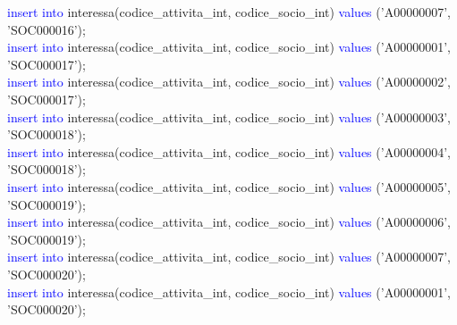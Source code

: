 \documentclass{article}
\begin{document}
\begin{flushleft}
{        \hspace*{0.5em}\textcolor{blue}{insert into} interessa(codice\_attivita\_int, codice\_socio\_int) \textcolor{blue}{values} \hspace*{0.5em}('A00000007', 'SOC000016'); \\
        \hspace*{0.5em}\textcolor{blue}{insert into} interessa(codice\_attivita\_int, codice\_socio\_int) \textcolor{blue}{values} \hspace*{0.5em}('A00000001', 'SOC000017'); \\
        \hspace*{0.5em}\textcolor{blue}{insert into} interessa(codice\_attivita\_int, codice\_socio\_int) \textcolor{blue}{values} \hspace*{0.5em}('A00000002', 'SOC000017'); \\
        \hspace*{0.5em}\textcolor{blue}{insert into} interessa(codice\_attivita\_int, codice\_socio\_int) \textcolor{blue}{values} \hspace*{0.5em}('A00000003', 'SOC000018'); \\
        \hspace*{0.5em}\textcolor{blue}{insert into} interessa(codice\_attivita\_int, codice\_socio\_int) \textcolor{blue}{values} \hspace*{0.5em}('A00000004', 'SOC000018'); \\
        \hspace*{0.5em}\textcolor{blue}{insert into} interessa(codice\_attivita\_int, codice\_socio\_int) \textcolor{blue}{values} \hspace*{0.5em}('A00000005', 'SOC000019'); \\
        \hspace*{0.5em}\textcolor{blue}{insert into} interessa(codice\_attivita\_int, codice\_socio\_int) \textcolor{blue}{values} \hspace*{0.5em}('A00000006', 'SOC000019'); \\
        \hspace*{0.5em}\textcolor{blue}{insert into} interessa(codice\_attivita\_int, codice\_socio\_int) \textcolor{blue}{values} \hspace*{0.5em}('A00000007', 'SOC000020'); \\
        \hspace*{0.5em}\textcolor{blue}{insert into} interessa(codice\_attivita\_int, codice\_socio\_int) \textcolor{blue}{values} \hspace*{0.5em}('A00000001', 'SOC000020'); \\
}
\end{flushleft}
\end{document}
